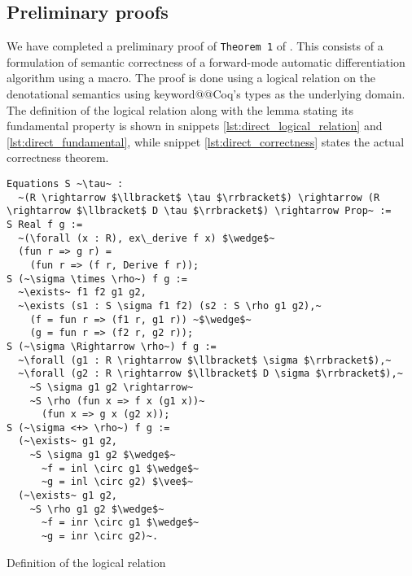\documentclass[12pt, final]{article}
\makeatletter
\def\<#1>{\csname keyword@@#1\endcsname}
\makeatother
\begin{document}
\subsection{Preliminary proofs}

We have completed a preliminary proof of \texttt{Theorem 1} of \cite{huot2020correctness}. This consists of a formulation of semantic correctness of a forward-mode automatic differentiation algorithm using a macro. The proof is done using a logical relation on the denotational semantics using \<Coq>'s types as the underlying domain. The definition of the logical relation along with the lemma stating its fundamental property is shown in snippets \ref{lst:direct_logical_relation} and \ref{lst:direct_fundamental}, while snippet \ref{lst:direct_correctness} states the actual correctness theorem.

\begin{listing}
  \begin{verbatim}
Equations S ~\tau~ :
  ~(R \rightarrow $\llbracket$ \tau $\rrbracket$) \rightarrow (R \rightarrow $\llbracket$ D \tau $\rrbracket$) \rightarrow Prop~ :=
S Real f g :=
  ~(\forall (x : R), ex\_derive f x) $\wedge$~
  (fun r => g r) =
    (fun r => (f r, Derive f r));
S (~\sigma \times \rho~) f g :=
  ~\exists~ f1 f2 g1 g2,
  ~\exists (s1 : S \sigma f1 f2) (s2 : S \rho g1 g2),~
    (f = fun r => (f1 r, g1 r)) ~$\wedge$~
    (g = fun r => (f2 r, g2 r));
S (~\sigma \Rightarrow \rho~) f g :=
  ~\forall (g1 : R \rightarrow $\llbracket$ \sigma $\rrbracket$),~
  ~\forall (g2 : R \rightarrow $\llbracket$ D \sigma $\rrbracket$),~
    ~S \sigma g1 g2 \rightarrow~
    ~S \rho (fun x => f x (g1 x))~
      (fun x => g x (g2 x));
S (~\sigma <+> \rho~) f g :=
  (~\exists~ g1 g2,
    ~S \sigma g1 g2 $\wedge$~
      ~f = inl \circ g1 $\wedge$~
      ~g = inl \circ g2) $\vee$~
  (~\exists~ g1 g2,
    ~S \rho g1 g2 $\wedge$~
      ~f = inr \circ g1 $\wedge$~
      ~g = inr \circ g2)~.
  \end{verbatim}
  \caption{Definition of the logical relation}
  \label{lst:direct_logical_relation}
\end{listing}
\end{document}
